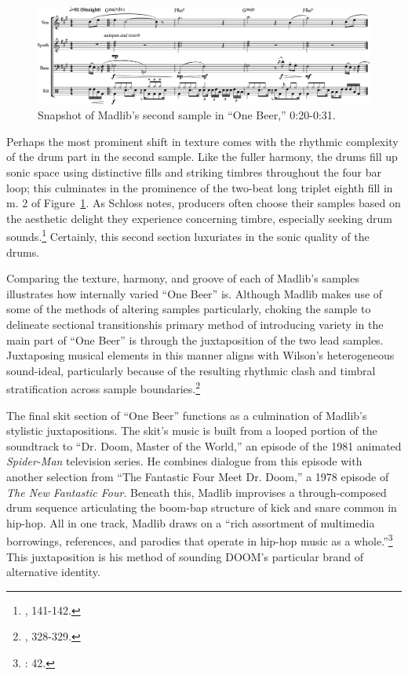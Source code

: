     \begin{figure}[ht]
        \centering
        \includegraphics[width=\textwidth]{images/figures/chp 02/020031onebeermain.pdf}
        \caption{Snapshot of Madlib's second sample in ``One Beer,'' 0:20-0:31.}
        \label{fig:onebeermain}
    \end{figure}

Perhaps the most prominent shift in texture comes with the rhythmic complexity of the drum part in the 
second sample. Like the fuller harmony, the drums fill up sonic space using distinctive fills and 
striking timbres throughout the four bar loop; this culminates in the prominence of the two-beat long 
triplet eighth fill in m. 2 of Figure~\ref{fig:onebeermain}. As Schloss notes, producers often choose 
their samples based on the aesthetic delight they experience concerning timbre, especially seeking drum
sounds.\footnote{\cite{josephgschlossMakingBeatsArt2004}, 141-142.} Certainly, this second section 
luxuriates in the sonic quality of the drums.

Comparing the texture, harmony, and groove of each of Madlib's samples illustrates how internally 
varied ``One Beer'' is. Although Madlib makes use of some of the methods of altering samples\textemdash
particularly, choking the sample to delineate sectional transitions\textemdash his primary method of
introducing variety in the main part of ``One Beer'' is through the juxtaposition of the two lead samples.
Juxtaposing musical elements in this manner aligns with Wilson's heterogeneous sound-ideal, particularly
because of the resulting rhythmic clash and  timbral stratification across sample
boundaries.\footnote{\cite{ollywilsonHeterogeneousSoundIdeal1992}, 328-329.}

The final skit section of ``One Beer'' functions as a culmination of Madlib's stylistic juxtapositions. 
The skit's music is built from a looped portion of the soundtrack to ``Dr. Doom, Master of the World,'' 
an episode of the 1981 animated \textit{Spider-Man} television series. He combines dialogue from this 
episode with another selection from ``The Fantastic Four Meet Dr. Doom,'' a 1978 episode of \textit{The 
New Fantastic Four}. Beneath this, Madlib improvises a through-composed drum sequence articulating the
boom-bap structure of kick and snare common in hip-hop. All in one track, Madlib draws on a ``rich 
assortment of multimedia borrowings, references, and parodies that operate in hip-hop music as a
whole.''\footnote{\cite{joannademersSampling1970sHipHop2003}: 42.} This juxtaposition is his method 
of sounding DOOM's particular brand of alternative identity.

